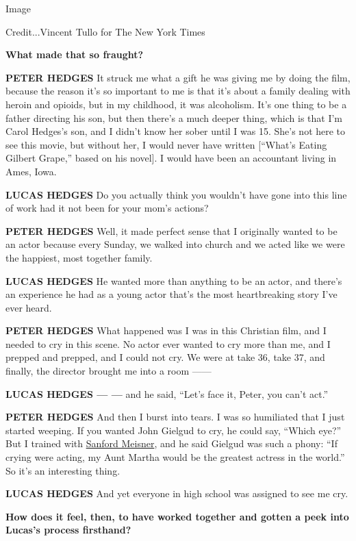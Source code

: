 Image

Credit...Vincent Tullo for The New York Times

\textbf{What made that so fraught?}

\textbf{PETER HEDGES} It struck me what a gift he was giving me by doing
the film, because the reason it's so important to me is that it's about
a family dealing with heroin and opioids, but in my childhood, it was
alcoholism. It's one thing to be a father directing his son, but then
there's a much deeper thing, which is that I'm Carol Hedges's son, and I
didn't know her sober until I was 15. She's not here to see this movie,
but without her, I would never have written {[}``What's Eating Gilbert
Grape,'' based on his novel{]}. I would have been an accountant living
in Ames, Iowa.

\textbf{LUCAS HEDGES} Do you actually think you wouldn't have gone into
this line of work had it not been for your mom's actions?

\textbf{PETER HEDGES} Well, it made perfect sense that I originally
wanted to be an actor because every Sunday, we walked into church and we
acted like we were the happiest, most together family.

\textbf{LUCAS HEDGES} He wanted more than anything to be an actor, and
there's an experience he had as a young actor that's the most
heartbreaking story I've ever heard.

\textbf{PETER HEDGES} What happened was I was in this Christian film,
and I needed to cry in this scene. No actor ever wanted to cry more than
me, and I prepped and prepped, and I could not cry. We were at take 36,
take 37, and finally, the director brought me into a room ------

\textbf{LUCAS HEDGES --- ---} and he said, ``Let's face it, Peter, you
can't act.''

\textbf{PETER HEDGES} And then I burst into tears. I was so humiliated
that I just started weeping. If you wanted John Gielgud to cry, he could
say, ``Which eye?'' But I trained with
\href{https://www.nytimes3xbfgragh.onion/1997/02/04/theater/sanford-meisner-a-mentor-who-guided-actors-and-directors-toward-truth-dies-at-91.html}{Sanford
Meisner}, and he said Gielgud was such a phony: ``If crying were acting,
my Aunt Martha would be the greatest actress in the world.'' So it's an
interesting thing.

\textbf{LUCAS HEDGES} And yet everyone in high school was assigned to
see me cry.

\textbf{How does it feel, then, to have worked together and gotten a
peek into Lucas's process firsthand?}

